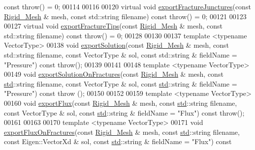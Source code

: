 \begin{DoxyCode}
{      const} \textcolor{keywordflow}{throw}() = 0;
00114 
00116 
00120     \textcolor{keyword}{virtual} \textcolor{keywordtype}{void} \hyperlink{classFVCode3D_1_1Exporter_ac905e24987d7b9d0b8e6aab739361bef}{exportFractureJunctures}(\textcolor{keyword}{const} \hyperlink{classFVCode3D_1_1Rigid__Mesh}{Rigid\_Mesh} & mesh, \textcolor{keyword}{const} 
      std::string filename) \textcolor{keyword}{const} \textcolor{keywordflow}{throw}() = 0;
00121 
00123 
00127     \textcolor{keyword}{virtual} \textcolor{keywordtype}{void} \hyperlink{classFVCode3D_1_1Exporter_a98c3d2800090caa7c7249ce802dd8792}{exportFractureTips}(\textcolor{keyword}{const} \hyperlink{classFVCode3D_1_1Rigid__Mesh}{Rigid\_Mesh} & mesh, \textcolor{keyword}{const} std::string 
      filename) \textcolor{keyword}{const} \textcolor{keywordflow}{throw}() = 0;
00128 
00130 
00137     \textcolor{keyword}{template} <\textcolor{keyword}{typename} VectorType>
00138     \textcolor{keywordtype}{void} \hyperlink{classFVCode3D_1_1Exporter_a7902cd61f1d122b4ac8ed2c1d1da700c}{exportSolution}(\textcolor{keyword}{const} \hyperlink{classFVCode3D_1_1Rigid__Mesh}{Rigid\_Mesh} & mesh, \textcolor{keyword}{const} std::string filename, \textcolor{keyword}{const} 
      VectorType & sol, \textcolor{keyword}{const} std::string & fieldName = \textcolor{stringliteral}{"Pressure"}) \textcolor{keyword}{const} throw();
00139 
00141 
00148     template <typename VectorType>
00149     \textcolor{keywordtype}{void} \hyperlink{classFVCode3D_1_1Exporter_a64dba2dc601941c720cf1b7f73a6ff3b}{exportSolutionOnFractures}(const \hyperlink{classFVCode3D_1_1Rigid__Mesh}{Rigid\_Mesh} & mesh, const 
      \hyperlink{namespacestd}{std}::\textcolor{keywordtype}{string} filename, const VectorType & sol, const \hyperlink{namespacestd}{std}::\textcolor{keywordtype}{string} & fieldName = "Pressure") const throw
      ();
00150 
00152 
00159     template <typename VectorType>
00160     \textcolor{keywordtype}{void} \hyperlink{classFVCode3D_1_1Exporter_a8535245a89df8fca2fe6fbd8fab11265}{exportFlux}(const \hyperlink{classFVCode3D_1_1Rigid__Mesh}{Rigid\_Mesh} & mesh, const \hyperlink{namespacestd}{std}::\textcolor{keywordtype}{string} filename, const 
      VectorType & sol, const \hyperlink{namespacestd}{std}::\textcolor{keywordtype}{string} & fieldName = "Flux") const throw();
00161 
00163 
00170     template <typename VectorType>
00171     \textcolor{keywordtype}{void} \hyperlink{classFVCode3D_1_1Exporter_a3011faad5f0b873cf7502d0141cef625}{exportFluxOnFractures}(const \hyperlink{classFVCode3D_1_1Rigid__Mesh}{Rigid\_Mesh} & mesh, const 
      \hyperlink{namespacestd}{std}::\textcolor{keywordtype}{string} filename, const Eigen::VectorXd & sol, const \hyperlink{namespacestd}{std}::\textcolor{keywordtype}{string} & fieldName = "Flux") const 

\end{DoxyCode}
